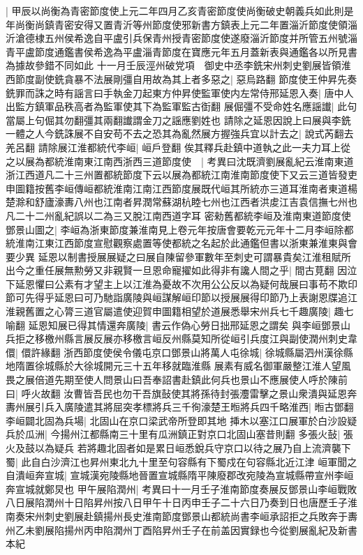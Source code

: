 |{
	甲辰以尚衡為青密節度使上元二年四月乙亥青密節度使尚衡破史朝義兵如此則是年尚衡尚鎮青密安得又置青沂等州節度使邪新書方鎮表上元二年置淄沂節度使領淄沂滄德棣五州侯希逸自平盧引兵保青州授青密節度使遂廢淄沂節度并所管五州號淄青平盧節度通鑑書侯希逸為平盧淄青節度在寶應元年五月蓋新表與通鑑各以所見書為據故參錯不同如此}
十一月壬辰涇州破党項　御史中丞李銑宋州刺史劉展皆領淮西節度副使銑貪暴不法展剛彊自用故為其上者多惡之|{
	惡烏路翻}
節度使王仲昇先奏銑罪而誅之時有謡言曰手執金刀起東方仲昇使監軍使内左常侍邢延恩入奏|{
	唐中人出監方鎮軍品秩高者為監軍使其下為監軍監古衘翻}
展倔彊不受命姓名應謡䜟|{
	此句當屬上句倔其勿翻彊其兩翻䜟謂金刀之謡應劉姓也}
請除之延恩因說上曰展與李銑一體之人今銑誅展不自安苟不去之恐其為亂然展方握強兵宜以計去之|{
	說式芮翻去羌呂翻}
請除展江淮都統代李峘|{
	峘戶登翻}
俟其釋兵赴鎮中道執之此一夫力耳上從之以展為都統淮南東江南西浙西三道節度使　|{
	考異曰沈既濟劉展亂紀云淮南東道浙江西道凡二十三州置都統節度下云以展為都統江南淮南節度使下又云三道皆發吏申圖籍按舊李峘傳峘都統淮南江南江西節度展既代峘其所統亦三道耳淮南者東道楊楚滁和舒廬濠夀八州也江南者昇潤常蘇湖杭睦七州也江西者洪䖍江吉袁信撫七州也凡二十二州亂紀誤以二為三又脫江南西道字耳}
密勑舊都統李峘及淮南東道節度使鄧景山圖之|{
	李峘為浙東節度兼淮南見上卷元年按唐會要乾元元年十二月李峘除都統淮南江東江西節度宣慰觀察處置等使都統之名起於此通鑑但書以浙東兼淮東與會要少異}
延恩以制書授展展疑之曰展自陳留參軍數年至刺史可謂暴貴矣江淮租賦所出今之重任展無勲勞又非親賢一旦恩命寵擢如此得非有讒人間之乎|{
	間古莧翻}
因泣下延恩懼曰公素有才望主上以江淮為憂故不次用公公反以為疑何哉展曰事苟不欺印節可先得乎延恩曰可乃馳詣廣陵與峘謀解峘印節以授展展得印節乃上表謝恩牒追江淮親舊置之心膂三道官屬遣使迎賀申圖籍相望於道展悉舉宋州兵七千趣廣陵|{
	趣七喻翻}
延恩知展已得其情還奔廣陵|{
	書云作偽心勞日拙邢延恩之謂矣}
與李峘鄧景山兵拒之移檄州縣言展反展亦移檄言峘反州縣莫知所從峘引兵度江與副使潤州刺史韋儇|{
	儇許緣翻}
浙西節度使侯令儀屯京口鄧景山將萬人屯徐城|{
	徐城縣屬泗州漢徐縣地隋置徐城縣於大徐城開元三十五年移就臨淮縣}
展素有威名御軍嚴整江淮人望風畏之展倍道先期至使人問景山曰吾奉詔書赴鎮此何兵也景山不應展使人呼於陳前曰|{
	呼火故翻}
汝曹皆吾民也勿干吾旗鼔使其將孫待封張灋雷擊之景山衆潰與延恩奔夀州展引兵入廣陵遣其將屈突孝標將兵三千徇濠楚王暅將兵四千略淮西|{
	暅古鄧翻}
李峘闢北固為兵場|{
	北固山在京口梁武帝所登即其地}
挿木以塞江口展軍於白沙設疑兵於瓜洲|{
	今揚州江都縣南三十里有瓜洲鎮正對京口北固山塞昔則翻}
多張火鼔|{
	張火及鼓以為疑兵}
若將趣北固者如是累日峘悉銳兵守京口以待之展乃自上流濟襲下蜀|{
	此自白沙濟江也昇州東北九十里至句容縣有下蜀戍在句容縣北近江津}
峘軍聞之自潰峘奔宣城|{
	宣城漢宛陵縣地晉置宣城縣隋平陳廢郡改宛陵為宣城縣帶宣州李峘奔宣城就鄭炅也}
甲午展陷潤州|{
	考異曰十一月壬子淮南節度奏展反鄧景山李峘戰敗八日展陷潤州十日陷昇州按八日甲午十日丙申壬子二十六日乃奏到日也唐歷壬子淮南奏宋州刺史劉展赴鎮揚州長史淮南節度鄧景山都統尚書李峘承詔拒之兵敗奔于夀州乙未劉展陷揚州丙申陷潤州丁酉陷昇州壬子在前盖因實録也今從劉展亂紀及新書本紀}
